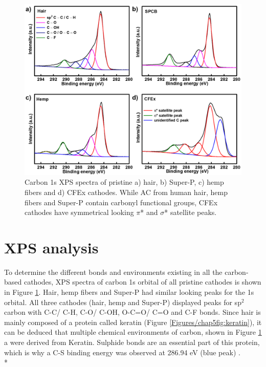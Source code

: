 \begin{figure}[h!]
  \centering
  \includegraphics[width=\textwidth]{Figures/chap5fig/XPSC}
    \caption{Carbon 1s XPS spectra of pristine a) hair, b) Super-P, c) hemp fibers and d) CFEx cathodes. While AC from human hair, hemp fibers and Super-P contain carbonyl functional groups, CFEx cathodes have symmetrical looking $\pi$* and $\sigma$* satellite peaks.}
  \label{Figures/chap5fig:XPSC}
\end{figure}
\section*{XPS analysis}
To determine the different bonds and environments existing in all the carbon-based cathodes, XPS spectra of carbon 1s orbital of all pristine cathodes is shown in Figure \ref{Figures/chap5fig:XPSC}. Hair, hemp fibers and Super-P had similar looking peaks for the 1s orbital. All three cathodes (hair, hemp and Super-P) displayed peaks for sp$^2$ carbon with C-C/ C-H, C-O/ C-OH, O-C=O/ C=O and C-F bonds. Since hair is mainly composed of a protein called keratin (Figure \ref{Figures/chap5fig:keratin}), it can be deduced that multiple chemical environments of carbon, shown in Figure \ref{Figures/chap5fig:XPSC} a were derived from Keratin. Sulphide bonds are an essential part of this protein, which is why a C-S binding energy was observed at 286.94 eV (blue peak) \cite{qian_human_2013}.\\*

